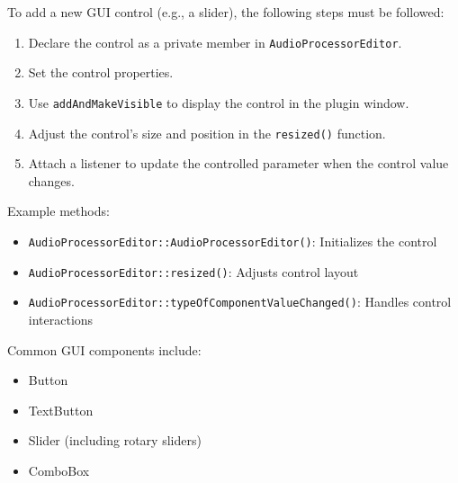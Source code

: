 To add a new GUI control (e.g., a slider), the following steps must be followed:

\begin{enumerate}
    \item Declare the control as a private member in \texttt{AudioProcessorEditor}.
    \item Set the control properties.
    \item Use \texttt{addAndMakeVisible} to display the control in the plugin window.
    \item Adjust the control’s size and position in the \texttt{resized()} function.
    \item Attach a listener to update the controlled parameter when the control value changes.
\end{enumerate}

Example methods:

\begin{itemize}
    \item \texttt{AudioProcessorEditor::AudioProcessorEditor()}: Initializes the control
    \item \texttt{AudioProcessorEditor::resized()}: Adjusts control layout
    \item \texttt{AudioProcessorEditor::typeOfComponentValueChanged()}: Handles control interactions
\end{itemize}

Common GUI components include:

\begin{itemize}
    \item Button
    \item TextButton
    \item Slider (including rotary sliders)
    \item ComboBox
\end{itemize}
